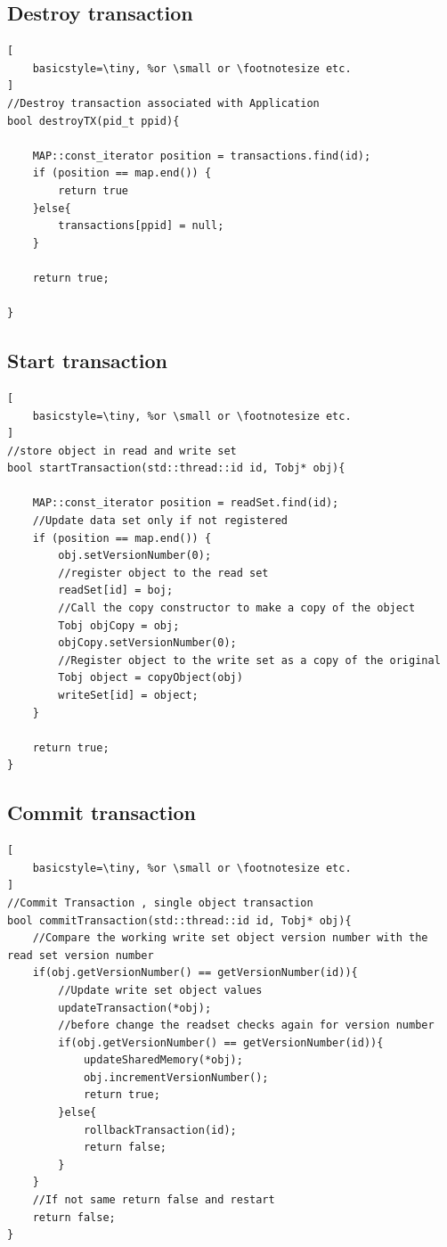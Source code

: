 \documentclass[12pt]{article}
\begin{document}
\subsection{Destroy transaction}
\begin{lstlisting}[
    basicstyle=\tiny, %or \small or \footnotesize etc.
]
//Destroy transaction associated with Application
bool destroyTX(pid_t ppid){

	MAP::const_iterator position = transactions.find(id);
	if (position == map.end()) {
	    return true
	}else{
		transactions[ppid] = null;
	}

	return true;
	
}
\end{lstlisting}

\subsection{Start transaction}
\begin{lstlisting}[
    basicstyle=\tiny, %or \small or \footnotesize etc.
]
//store object in read and write set
bool startTransaction(std::thread::id id, Tobj* obj){

	MAP::const_iterator position = readSet.find(id);
	//Update data set only if not registered
	if (position == map.end()) {
		obj.setVersionNumber(0);
	    //register object to the read set
		readSet[id] = boj;
		//Call the copy constructor to make a copy of the object
		Tobj objCopy = obj;
		objCopy.setVersionNumber(0);
		//Register object to the write set as a copy of the original
		Tobj object = copyObject(obj)
		writeSet[id] = object;
	} 
	
	return true;
}
\end{lstlisting}


\subsection{Commit transaction}
\begin{lstlisting}[
    basicstyle=\tiny, %or \small or \footnotesize etc.
]
//Commit Transaction , single object transaction
bool commitTransaction(std::thread::id id, Tobj* obj){
	//Compare the working write set object version number with the read set version number
	if(obj.getVersionNumber() == getVersionNumber(id)){
		//Update write set object values
		updateTransaction(*obj);
		//before change the readset checks again for version number
		if(obj.getVersionNumber() == getVersionNumber(id)){
			updateSharedMemory(*obj);
			obj.incrementVersionNumber();
			return true;
		}else{
			rollbackTransaction(id);
			return false;
		}
	}
	//If not same return false and restart
	return false;
}
\end{lstlisting}
\end{document}

